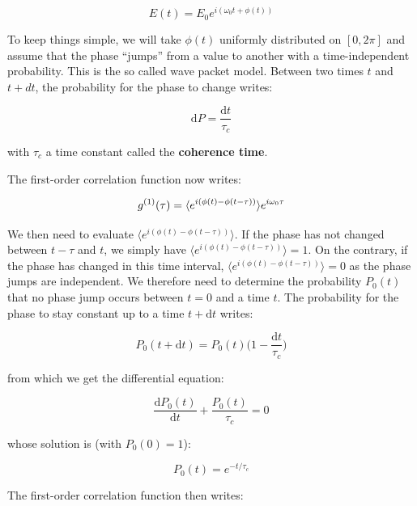 \begin{equation}
    E(t)=E_0 e^{i (\omega_0 t + \phi(t))}
\end{equation}

\noindent To keep things simple, we will take $\phi(t)$ uniformly distributed on $[0,2\pi]$ and assume that the phase ``jumps'' from a value to another with a time-independent probability. This is the so called wave packet model. Between two times $t$ and $t+dt$, the probability for the phase to change writes:

\begin{equation}
    \mathrm{d}P = \frac{\mathrm{d}t}{\tau_c}
\end{equation}

\noindent with $\tau_c$ a time constant called the \textbf{coherence time}.

The first-order correlation function now writes:

\begin{equation}
    g^{(1)} (\tau) = \langle e^{i(\phi(t)-\phi(t-\tau))}\rangle e^{i \omega_0 \tau}
\end{equation}

\noindent We then need to evaluate $\langle e^{i(\phi(t)-\phi(t-\tau))} \rangle$. If the phase has not changed between $t-\tau$ and $t$, we simply have $\langle e^{i(\phi(t)-\phi(t-\tau))} \rangle=1$. On the contrary, if the phase has changed in this time interval, $\langle e^{i(\phi(t)-\phi(t-\tau))} \rangle=0$ as the phase jumps are independent. We therefore need to determine the probability $P_0(t)$ that no phase jump occurs between $t=0$ and a time $t$. The probability for the phase to stay constant up to a time $t+ \mathrm{d}t$ writes:


\begin{equation}
    P_0(t+\mathrm{d}t)=P_0(t)  \Big(1-\frac{\mathrm{d}t}{\tau_c} \Big)
\end{equation}

\noindent from which we get the differential equation:

\begin{equation}
    \frac{\mathrm{d}P_0(t)}{\mathrm{d}t} + \frac{P_0(t)}{\tau_c} = 0
\end{equation}

\noindent whose solution is (with $P_0(0)=1$):

\begin{equation}
    P_0(t)=e^{-t/\tau_c}
\end{equation}

\noindent The first-order correlation function then writes:


